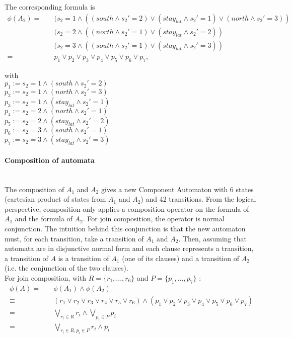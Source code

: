 \documentclass[runningheads]{llncs}
\begin{document}
\noindent
The corresponding formula is
\begin{align*}
\phi(A_2) =  & \quad ( s_2=1 \land ((south \land s_2'=2) \lor (stay_{lat}\land s_2'=1) \lor (north \land s_2'=3))  \\
	&\quad( s_2=2 \land ((north \land s_2'=1) \lor (stay_{lat}\land s_2'=2)) \\
	&\quad( s_2=3 \land ((south \land s_2'=1) \lor (stay_{lat}\land s_2'=3)) \\
	=  &\quad p_1 \lor p_2 \lor p_3 \lor p_4 \lor p_5 \lor p_6 \lor p_7 ,
\end{align*}

\noindent
with\\
$p_1 := s_2=1 \land (south \land s_2'=2)$\\ \quad
$p_2 := s_2=1 \land (north \land s_2'=3)$\\ \quad
$p_3 := s_2=1 \land (stay_{lat}\land s_2'=1)$\\ \quad
$p_4 := s_2=2 \land (north \land s_2'=1) $\\ \quad
$p_5 := s_2=2 \land (stay_{lat}\land s_2'=2)$\\ \quad
$p_6 := s_2=3 \land (south \land s_2'=1) $\\ \quad
$p_7 := s_2=3 \land (stay_{lat}\land s_2'=3) $\\ \quad


\paragraph{Composition of automata} \hspace{0pt} \\

The composition of $A_1$ and $A_2$ gives a new Component Automaton with 6 states (cartesian product of states from $A_1$ and $A_2$) and 42 transitions. From the logical perspective, composition only applies a composition operator on the formula of $A_1$ and the formula of $A_2$. 
For join composition, the operator is normal conjunction. The intuition behind this conjunction is that the new automaton must, for each transition, take a transition of $A_1$ and $A_2$. Then, assuming that automata are in disjunctive normal form and each clause represents a transition, a transition of $A$ is a transition of $A_1$ (one of its clauses) and a transition of $A_2$ (i.e. the conjunction of the two clauses). \\

For join composition, with $R = \{r_1, ..., r_6\}$ and $P=\{p_1, ...,p_7\}$  :
\begin{align*}
\phi(A)= &\quad \phi(A_1) \land \phi(A_2)\\
	\equiv & \quad (r_1 \lor r_2 \lor r_3 \lor r_4 \lor r_5 \lor r_6 ) \land (p_1 \lor p_2 \lor p_3 \lor p_4 \lor p_5 \lor p_6 \lor p_7)\\
	= & \quad \bigvee_{r_{i} \in R}r_i \land \bigvee_{p_i \in P} p_i\\
	= & \quad \bigvee_{r_{i} \in R, p_i \in P}r_i \land p_i
\end{align*}
\end{document}
